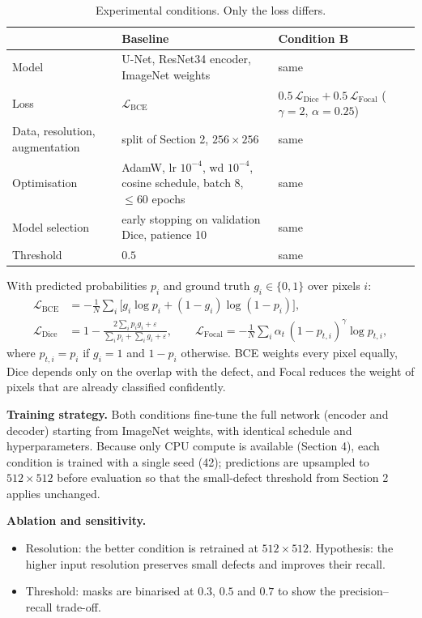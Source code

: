 \documentclass[11pt,a4paper]{article}
\begin{document}
\begin{table}[h]
\centering
\small
\begin{tabularx}{\linewidth}{lXX}
\toprule
 & Baseline & Condition B \\
\midrule
Model & U-Net, ResNet34 encoder, ImageNet weights & same \\
Loss & $\mathcal{L}_{\mathrm{BCE}}$ & $0.5\,\mathcal{L}_{\mathrm{Dice}} + 0.5\,\mathcal{L}_{\mathrm{Focal}}$ ($\gamma=2$, $\alpha=0.25$) \\
Data, resolution, augmentation & split of Section 2, $256\times256$ & same \\
Optimisation & AdamW, lr $10^{-4}$, wd $10^{-4}$, cosine schedule, batch 8, $\le 60$ epochs & same \\
Model selection & early stopping on validation Dice, patience 10 & same \\
Threshold & $0.5$ & same \\
\bottomrule
\end{tabularx}
\caption{Experimental conditions. Only the loss differs.}
\end{table}

With predicted probabilities $p_i$ and ground truth $g_i\in\{0,1\}$ over pixels $i$:
\begin{align*}
\mathcal{L}_{\mathrm{BCE}} &= -\frac{1}{N}\sum_i \big[g_i\log p_i + (1-g_i)\log(1-p_i)\big],\\
\mathcal{L}_{\mathrm{Dice}} &= 1 - \frac{2\sum_i p_i g_i + \varepsilon}{\sum_i p_i + \sum_i g_i + \varepsilon},\qquad
\mathcal{L}_{\mathrm{Focal}} = -\frac{1}{N}\sum_i \alpha_t\,(1-p_{t,i})^{\gamma}\log p_{t,i},
\end{align*}
where $p_{t,i}=p_i$ if $g_i=1$ and $1-p_i$ otherwise. BCE weights every pixel equally, Dice depends only on the overlap with the defect, and Focal reduces the weight of pixels that are already classified confidently.

\textbf{Training strategy.} Both conditions fine-tune the full network (encoder and decoder) starting from ImageNet weights, with identical schedule and hyperparameters. Because only CPU compute is available (Section 4), each condition is trained with a single seed (42); predictions are upsampled to $512\times512$ before evaluation so that the small-defect threshold from Section 2 applies unchanged.

\textbf{Ablation and sensitivity.}
\begin{itemize}
  \item Resolution: the better condition is retrained at $512\times512$. Hypothesis: the higher input resolution preserves small defects and improves their recall.
  \item Threshold: masks are binarised at $0.3$, $0.5$ and $0.7$ to show the precision--recall trade-off.
\end{itemize}
\end{document}
